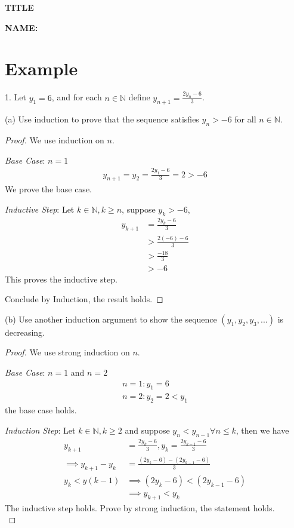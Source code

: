 \documentclass[12pt]{article}
\newcommand{\N}{\mathbb{N}}
\begin{document}
\begin{center}
    \textbf{TITLE}
\end{center}

\textbf{NAME:} 

\section*{Example}

1. Let $y_1=6$, and for each $n\in \N$ define $y_{n+1}=\frac{2y_n-6}{3}$.

(a) Use induction to prove that the sequence satisfies $y_n>-6$ for all $n\in \N$.

\begin{proof}
    We use induction on $n$.

    \textit{Base Case}: $n=1$
    \begin{align*}
        y_{n+1} = y_2 = \frac{2y_1-6}{3} = 2 > -6
    \end{align*}
    \indent We prove the base case.

    \textit{Inductive Step}: Let $k \in \N, k \geq n$, suppose $y_k > -6$,
    \begin{align*}
        y_{k+1} & = \frac{2y_{k}-6}{3} \\
        & > \frac{2(-6) - 6}{3} \\
        & > \frac{-18}{3} \\
        & > -6
    \end{align*}
    \indent This proves the inductive step.

    Conclude by Induction, the result holds.
\end{proof}

(b) Use another induction argument to show the sequence $(y_1,y_2,y_3,...)$ is decreasing.

\begin{proof}
    We use strong induction on $n$.

    
    \textit{Base Case}: $n=1$ and $n=2$
    \begin{align*}
        n=1: y_1 = 6 \\
        n=2: y_2 = 2 < y_1
    \end{align*}
    \indent the base case holds.

    \textit{Induction Step}: Let $k \in \N, k \geq 2$ and suppose $y_n < y_{n-1} \forall n \leq k$, then we have
    \begin{align*}
        y_{k+1} & = \frac{2y_k-6}{3}, y_k = \frac{2y_{k-1}-6}{3} \\
        \implies y_{k+1} - y_k & = \frac{(2y_k-6) - (2y_{k-1}-6)}{3} \\
        y_{k} < y(k-1) & \implies (2y_k-6) < (2y_{k-1}-6) \\
        & \implies y_{k+1} < y_k
    \end{align*}
    \indent The inductive step holds. Prove by strong induction, the statement holds. \\
\end{proof}
\end{document}
